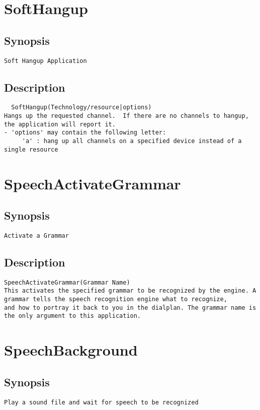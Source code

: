 \section{SoftHangup}
\subsection{Synopsis}
\begin{verbatim}
Soft Hangup Application
\end{verbatim}
\subsection{Description}
\begin{verbatim}
  SoftHangup(Technology/resource|options)
Hangs up the requested channel.  If there are no channels to hangup,
the application will report it.
- 'options' may contain the following letter:
     'a' : hang up all channels on a specified device instead of a single resource

\end{verbatim}


\section{SpeechActivateGrammar}
\subsection{Synopsis}
\begin{verbatim}
Activate a Grammar
\end{verbatim}
\subsection{Description}
\begin{verbatim}
SpeechActivateGrammar(Grammar Name)
This activates the specified grammar to be recognized by the engine. A grammar tells the speech recognition engine what to recognize, 
and how to portray it back to you in the dialplan. The grammar name is the only argument to this application.

\end{verbatim}


\section{SpeechBackground}
\subsection{Synopsis}
\begin{verbatim}
Play a sound file and wait for speech to be recognized
\end{verbatim}
